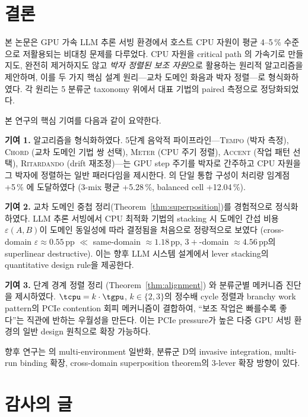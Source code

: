 
\section{결론}
\label{sec:conclusion}

본 논문은 GPU 가속 LLM 추론 서빙 환경에서 호스트 CPU 자원이 평균 4--5\,\% 수준으로 저활용되는 비대칭 문제를 다루었다.
CPU 자원을 critical path 의 가속기로 만들지도, 완전히 제거하지도 않고 \emph{박자 정렬된 보조 자원}으로 활용하는 원리적 알고리즘을 제안하며, 이를 두 가지 핵심 설계 원리---교차 도메인 화음과 박자 정렬---로 형식화하였다.
각 원리는 5 분류군 taxonomy 위에서 대표 기법의 paired 측정으로 정당화되었다.

본 연구의 핵심 기여를 다음과 같이 요약한다.

\textbf{기여 1.} \algname 알고리즘을 형식화하였다.
5단계 음악적 파이프라인---\textsc{Tempo} (박자 측정), \textsc{Chord} (교차 도메인 기법 쌍 선택), \textsc{Meter} (CPU 주기 정렬), \textsc{Accent} (작업 패턴 선택), \textsc{Ritardando} (drift 재조정)---는 GPU step 주기를 박자로 간주하고 CPU 자원을 그 박자에 정렬하는 일반 패러다임을 제시한다.
\algname 의 단일 통합 구성이 처리량 임계점 +5\,\% 에 도달하였다 (3-mix 평균 +5.28\,\%, balanced cell +12.04\,\%).

\textbf{기여 2.} 교차 도메인 중첩 정리(Theorem~\ref{thm:superposition})를 경험적으로 정식화하였다.
LLM 추론 서빙에서 CPU 최적화 기법의 stacking 시 도메인 간섭 비용 $\varepsilon(A, B)$이 도메인 동일성에 따라 결정됨을 처음으로 정량적으로 보였다 (cross-domain $\varepsilon \approx 0.55$\,pp $\ll$ same-domain $\approx 1.18$\,pp, $3+$-domain $\approx 4.56$\,pp의 superlinear destructive).
이는 향후 LLM 시스템 설계에서 lever stacking의 quantitative design rule을 제공한다.

\textbf{기여 3.} 단계 경계 정렬 정리 (Theorem~\ref{thm:alignment}) 와 분류군별 메커니즘 진단을 제시하였다.
$\tcpu = k \cdot \tgpu$, $k \in \{2, 3\}$의 정수배 cycle 정렬과 branchy work pattern의 PCIe contention 회피 메커니즘이 결합하여, ``보조 작업은 빠를수록 좋다''는 직관에 반하는 우월성을 만든다.
이는 PCIe pressure가 높은 다중 GPU 서빙 환경의 일반 design 원칙으로 확장 가능하다.

향후 연구는 \algname 의 multi-environment 일반화, 분류군 D의 invasive integration, multi-run binding 확장, cross-domain superposition theorem의 3-lever 확장 방향이 있다.

\section*{감사의 글}
\label{sec:acknowledgments}


